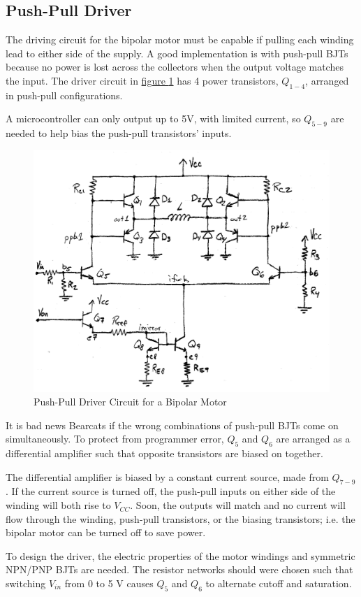 \documentclass[10pt, twocolumn]{article}
\begin{document}
\subsection{Push-Pull Driver}

The driving circuit for the bipolar motor must be capable if pulling 
each winding lead to either side of the supply.
A good implementation is with push-pull BJTs because no power
is lost across the collectors when the output voltage matches the input.
The driver circuit in 
\hyperref[motor-driver-circuit]{figure \ref{motor-driver-circuit}}
has 4 power transistors, $Q_{1-4}$, arranged in push-pull configurations.

A microcontroller can only output up to 5V, with limited current, so
$Q_{5-9}$ are needed to help bias the push-pull transistors' inputs.

\begin{figure}
	\centering
	\includegraphics[width=.65\textwidth]{Figures/motor-driver-circuit.pdf}
	\caption{Push-Pull Driver Circuit for a Bipolar Motor}
	\label{motor-driver-circuit}
\end{figure}

It is bad news Bearcats if the wrong combinations of push-pull BJTs
come on simultaneously.
To protect from programmer error, $Q_{5}$ and $Q_{6}$ are arranged 
as a differential amplifier such that opposite transistors are biased on together. 

The differential amplifier is biased by a constant current source,
made from $Q_{7-9}$.
If the current source is turned off, the push-pull inputs on either 
side of the winding will both rise to $V_{CC}$.
Soon, the outputs will match and no current will flow through the winding,
push-pull transistors, or the biasing transistors;
i.e. the bipolar motor can be turned off to save power.

To design the driver, the electric properties of the motor windings
and symmetric NPN/PNP BJTs are needed.
The resistor networks should were chosen such that switching $V_{in}$ from
0 to 5 V causes $Q_{5}$ and $Q_{6}$ to alternate cutoff and saturation.
\end{document}
